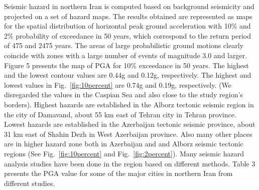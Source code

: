 \documentclass{article}
\begin{document}
Seismic hazard in northern Iran is computed based on background seismicity and projected on a set of hazard maps. The results obtained are represented as maps for the spatial distribution of horizontal peak ground acceleration with 10\% and 2\% probability of exceedance in 50 years, which correspond to the return period of 475 and 2475 years. The areas of large probabilistic ground motions clearly coincide with zones with a large number of events of magnitude 3.0 and larger. Figure 5 presents the map of PGA for 10\% exceedance in 50 years. The highest and the lowest contour values are 0.44g and 0.12g, respectively. The highest and lowest values in Fig.~\ref{fig:10percent} are 0.74g and 0.19g, respectively. (We disregarded the values in the Caspian Sea and also close to the study region's borders). Highest hazards are established in the Alborz tectonic seismic region in the city of Damavand, about 55 km east of Tehran city in Tehran province. Lowest hazards are established in the Azerbaijan tectonic seismic province, about 31 km east of Shahin Dezh in West Azerbaijan province. Also many other places are in higher hazard zone both in Azerbaijan and and Alborz seismic tectonic regions (See Fig.~\ref{fig:10percent} and Fig.~\ref{fig:2percent}). Many seismic hazard analysis studies have been done in the region based on different methods. Table 3 presents the PGA value for some of the major cities in northern Iran from different studies.
\end{document}
